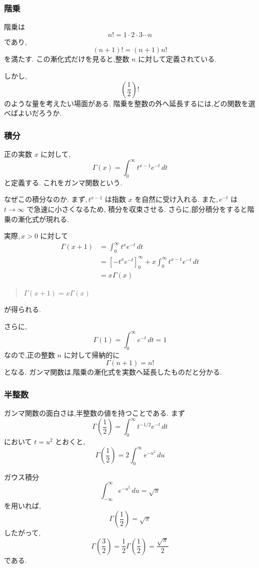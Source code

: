 \subsubsection{階乗}

階乗は
\[
  n!=1\cdot2\cdot3\cdots n
\]
であり,
\[
  (n+1)!=(n+1)n!
\]
を満たす.
この漸化式だけを見ると,整数 $n$ に対して定義されている.

しかし,
\[
  \left(\frac12\right)!
\]
のような量を考えたい場面がある.
階乗を整数の外へ延長するには,どの関数を選べばよいだろうか.

\subsubsection{積分}

正の実数 $x$ に対して,
\[
  \Gamma(x)=\int_0^\infty t^{x-1}e^{-t}\,dt
\]
と定義する.
これをガンマ関数という.

なぜこの積分なのか.
まず,\,$t^{x-1}$ は指数 $x$ を自然に受け入れる.
また,\,$e^{-t}$ は $t\to\infty$ で急速に小さくなるため,
積分を収束させる.
さらに,部分積分をすると階乗の漸化式が現れる.

実際,\,$x>0$ に対して
\[
\begin{aligned}
  \Gamma(x+1)
  &=\int_0^\infty t^x e^{-t}\,dt\\
  &=\left[-t^xe^{-t}\right]_0^\infty
    +x\int_0^\infty t^{x-1}e^{-t}\,dt\\
  &=x\Gamma(x)
\end{aligned}
\]
\begin{quote}
  $\Gamma(x+1)=x\Gamma(x)$
\end{quote}
が得られる.

さらに,
\[
  \Gamma(1)=\int_0^\infty e^{-t}\,dt=1
\]
なので,正の整数 $n$ に対して帰納的に
\[
  \Gamma(n+1)=n!
\]
となる.
ガンマ関数は,階乗の漸化式を実数へ延長したものだと分かる.

\subsubsection{半整数}

ガンマ関数の面白さは,半整数の値を持つことである.
まず
\[
  \Gamma\left(\frac12\right)
  =\int_0^\infty t^{-1/2}e^{-t}\,dt
\]
において $t=u^2$ とおくと,
\[
  \Gamma\left(\frac12\right)
  =2\int_0^\infty e^{-u^2}\,du
\]

ガウス積分
\[
  \int_{-\infty}^{\infty}e^{-u^2}\,du=\sqrt{\pi}
\]
を用いれば,
\[
  \Gamma\left(\frac12\right)=\sqrt{\pi}
\]
したがって,
\[
  \Gamma\left(\frac32\right)
  =\frac12\Gamma\left(\frac12\right)
  =\frac{\sqrt{\pi}}2
\]
である.

